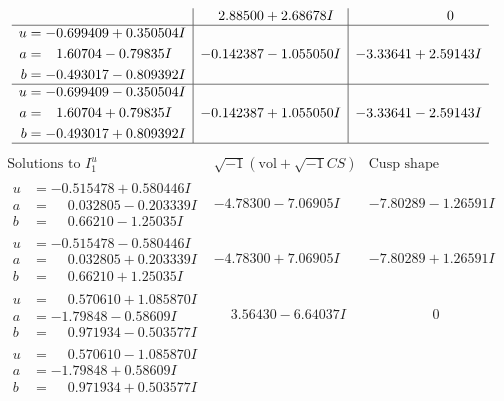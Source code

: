 \documentclass[1p]{elsarticle_modified}
\theoremstyle{definition}
\newcommand{\I}{\sqrt{-1}}
\begin{document}
$$\begin{array}{c|c|c}
 & \phantom{-}2.88500 + 2.68678 I & \phantom{-0.000000 } 0 \\ \hline\begin{aligned}
u &= -0.699409 + 0.350504 I \\
a &= \phantom{-}1.60704 - 0.79835 I \\
b &= -0.493017 - 0.809392 I\end{aligned}
 & -0.142387 - 1.055050 I & -3.33641 + 2.59143 I \\ \hline\begin{aligned}
u &= -0.699409 - 0.350504 I \\
a &= \phantom{-}1.60704 + 0.79835 I \\
b &= -0.493017 + 0.809392 I\end{aligned}
 & -0.142387 + 1.055050 I & -3.33641 - 2.59143 I\\
 \hline 
 \end{array}$$\newpage$$\begin{array}{c|c|c}  
\text{Solutions to }I^u_{1}& \I (\text{vol} + \sqrt{-1}CS) & \text{Cusp shape}\\
 \hline 
\begin{aligned}
u &= -0.515478 + 0.580446 I \\
a &= \phantom{-}0.032805 - 0.203339 I \\
b &= \phantom{-}0.66210 - 1.25035 I\end{aligned}
 & -4.78300 - 7.06905 I & -7.80289 - 1.26591 I \\ \hline\begin{aligned}
u &= -0.515478 - 0.580446 I \\
a &= \phantom{-}0.032805 + 0.203339 I \\
b &= \phantom{-}0.66210 + 1.25035 I\end{aligned}
 & -4.78300 + 7.06905 I & -7.80289 + 1.26591 I \\ \hline\begin{aligned}
u &= \phantom{-}0.570610 + 1.085870 I \\
a &= -1.79848 - 0.58609 I \\
b &= \phantom{-}0.971934 - 0.503577 I\end{aligned}
 & \phantom{-}3.56430 - 6.64037 I & \phantom{-0.000000 } 0 \\ \hline\begin{aligned}
u &= \phantom{-}0.570610 - 1.085870 I \\
a &= -1.79848 + 0.58609 I \\
b &= \phantom{-}0.971934 + 0.503577 I\end{aligned}

\end{array}$$
\end{document}
